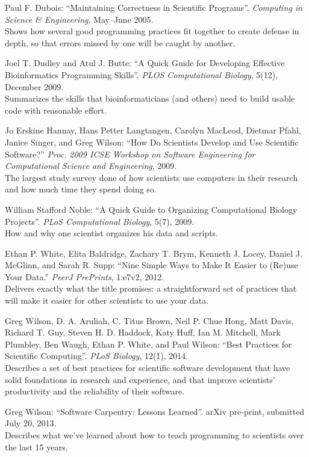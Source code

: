 \documentclass{book}
\begin{document}
\begin{swcitemize}
\item
  Paul F. Dubois: ``Maintaining Correctness in Scientific Programs''.
  \emph{Computing in Science \& Engineering}, May--June 2005. \\ Shows
  how several good programming practices fit together to create defense
  in depth, so that errors missed by one will be caught by another.
\item
  Joel T. Dudley and Atul J. Butte: ``A Quick Guide for Developing
  Effective Bioinformatics Programming Skills''. \emph{PLOS
  Computational Biology}, 5(12), December 2009. \\ Summarizes the skills
  that bioinformaticians (and others) need to build usable code with
  reasonable effort.
\item
  Jo Erskine Hannay, Hans Petter Langtangen, Carolyn MacLeod, Dietmar
  Pfahl, Janice Singer, and Greg Wilson: ``How Do Scientists Develop and
  Use Scientific Software?'' \emph{Proc. 2009 ICSE Workshop on Software
  Engineering for Computational Science and Engineering}, 2009. \\ The
  largest study survey done of how scientists use computers in their
  research and how much time they spend doing so.
\item
  William Stafford Noble: ``A Quick Guide to Organizing Computational
  Biology Projects''. \emph{PLoS Computational Biology}, 5(7), 2009. \\
  How and why one scientist organizes his data and scripts.
\item
  Ethan P. White, Elita Baldridge, Zachary T. Brym, Kenneth J. Locey,
  Daniel J. McGlinn, and Sarah R. Supp: ``Nine Simple Ways to Make It
  Easier to (Re)use Your Data.'' \emph{PeerJ PrePrints}, 1:e7v2, 2012.
  \\ Delivers exactly what the title promises: a straightforward set of
  practices that will make it easier for other scientists to use your
  data.
\item
  Greg Wilson, D. A. Aruliah, C. Titus Brown, Neil P. Chue Hong, Matt
  Davis, Richard T. Guy, Steven H. D. Haddock, Katy Huff, Ian M.
  Mitchell, Mark Plumbley, Ben Waugh, Ethan P. White, and Paul Wilson:
  ``Best Practices for Scientific Computing''. \emph{PLoS Biology},
  12(1), 2014. \\ Describes a set of best practices for scientific
  software development that have solid foundations in research and
  experience, and that improve scientists' productivity and the
  reliability of their software.
\item
  Greg Wilson: ``Software Carpentry: Lessons Learned''. arXiv pre-print,
  submitted July 20, 2013. \\ Describes what we've learned about how to
  teach programming to scientists over the last 15 years.
\end{swcitemize}
\end{document}
